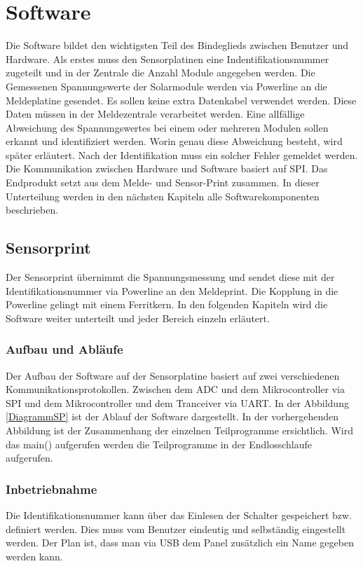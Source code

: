 \section{Software}
Die Software bildet den wichtigsten Teil des Bindeglieds zwischen Benutzer und Hardware. Als erstes muss den Sensorplatinen eine Indentifikationsnummer zugeteilt und in der Zentrale die Anzahl Module angegeben werden. Die Gemessenen Spannungswerte der Solarmodule werden via Powerline an die Meldeplatine gesendet. Es sollen keine extra Datenkabel verwendet werden. Diese Daten müssen in der Meldezentrale verarbeitet werden. Eine allfällige Abweichung des Spannungswertes bei einem oder mehreren Modulen sollen erkannt und identifiziert werden. Worin genau diese Abweichung besteht, wird später erläutert. Nach der Identifikation muss ein solcher Fehler gemeldet werden. Die Kommunikation zwischen Hardware und Software basiert auf SPI. Das Endprodukt setzt aus dem Melde- und Sensor-Print zusammen. In dieser Unterteilung werden in den nächsten Kapiteln alle Softwarekomponenten beschrieben.
\subsection{Sensorprint}
Der Sensorprint übernimmt die Spannungsmessung und sendet diese mit der Identifikationsnummer via Powerline an den Meldeprint. Die Kopplung in die Powerline gelingt mit einem Ferritkern. In den folgenden Kapiteln wird die Software weiter unterteilt und jeder Bereich einzeln erläutert.
\subsubsection{Aufbau und Abläufe}
Der Aufbau der Software auf der Sensorplatine basiert auf zwei verschiedenen Kommunikationsprotokollen. Zwischen dem ADC und dem Mikrocontroller via SPI und dem Mikrocontroller und dem Tranceiver via UART. In der Abbildung \ref{DiagrammSP} ist der Ablauf der Software dargestellt.
In der vorhergehenden Abbildung ist der Zusammenhang der einzelnen Teilprogramme ersichtlich. Wird das main() aufgerufen werden die Teilprogramme in der Endlosschlaufe aufgerufen.
\subsubsection{Inbetriebnahme}
Die Identifikationsnummer kann über das Einlesen der Schalter gespeichert bzw. definiert werden. Dies muss vom Benutzer eindeutig und selbständig eingestellt werden. Der Plan ist, dass man via USB dem Panel zusätzlich ein Name gegeben werden kann.
